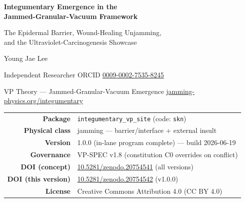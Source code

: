 \documentclass[11pt,a4paper]{article}
\renewcommand{\arraystretch}{1.18}
\begin{document}
\begin{titlepage}
\centering
{\sffamily\bfseries\LARGE
Integumentary Emergence in the\\[2pt]
Jammed-Granular-Vacuum Framework\par}
\vspace{0.7em}
{\sffamily\large
The Epidermal Barrier, Wound-Healing Unjamming,\\
and the Ultraviolet-Carcinogenesis Showcase\par}
\vspace{1.4em}
{\large Young Jae Lee\par}
\vspace{0.2em}
{\small Independent Researcher \;\textbar\; ORCID \href{https://orcid.org/0009-0002-7535-8245}{0009-0002-7535-8245}\par}
\vspace{0.2em}
{\small VP Theory --- Jammed-Granular-Vacuum Emergence \;\textbar\; \href{https://jamming-physics.org/integumentary/}{jamming-physics.org/integumentary}\par}

\vspace{1.8em}
\begin{minipage}{0.86\textwidth}\small\centering
\renewcommand{\arraystretch}{1.25}
\begin{tabular}{r l}
\textbf{Package} & \texttt{integumentary\_vp\_site} \;(code: \texttt{skn})\\
\textbf{Physical class} & jamming --- barrier/interface + external insult\\
\textbf{Version} & 1.0.0 \;(in-lane program complete) --- build 2026-06-19\\
\textbf{Governance} & VP-SPEC v1.8 (constitution C0 overrides on conflict)\\
\textbf{DOI (concept)} & \href{https://doi.org/10.5281/zenodo.20754541}{10.5281/zenodo.20754541} \;(all versions)\\
\textbf{DOI (this version)} & \href{https://doi.org/10.5281/zenodo.20754542}{10.5281/zenodo.20754542} \;(v1.0.0)\\
\textbf{License} & Creative Commons Attribution 4.0 (CC BY 4.0)\\
\end{tabular}
\end{minipage}


\end{titlepage}
\end{document}
